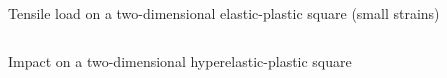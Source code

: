 \begin{frame}{Tensile load on a two-dimensional elastic-plastic square (small strains)}
  \vspace{-0.5cm}
  \begin{block}{}
    \begin{columns}
      \begin{column}{0.5\textwidth}
        
      \end{column}
      \begin{column}{0.5\textwidth}
        
      \end{column}
    \end{columns}
    
  \end{block}
  \vspace{-0.1cm}
  
\end{frame}

\begin{frame}{Impact on a two-dimensional hyperelastic-plastic square}
    \begin{columns}
      \begin{column}{0.49\textwidth}
        
      \end{column}
      \begin{column}{0.49\textwidth}
        
      \end{column}
    \end{columns}
\end{frame}

